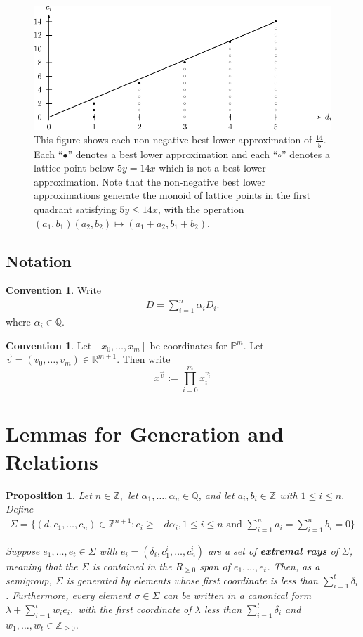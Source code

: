 \documentclass{amsart}
\theoremstyle{plain}
\newtheorem{prop}[thm]{Proposition}
\theoremstyle{definition}
\newtheorem{convention}[thm]{Convention}
\theoremstyle{remark}
\numberwithin{equation}{section}
\newcommand\ssec{\subsection}
\newcommand\br{{\mathbb R}}
\newcommand\bq{{\mathbb Q}}
\newcommand\bp{{\mathbb P}}
\newcommand\bz{{\mathbb Z}}
\newcommand\pdeg{\delta}
\begin{document}
\begin{figure}
\includegraphics{pics/spin-lower-approximations-pic-pics.pdf}
\caption{This figure shows each non-negative best lower
approximation of $\frac{14}{5}.$ Each ``$\bullet$'' denotes a best
lower approximation and each ``$\circ$'' denotes a lattice point
below $5y=14x$ which is not a best lower approximation.  Note that
the non-negative best lower approximations generate the monoid of
lattice points in the first quadrant satisfying  $5y \le 14x$, with
the operation $(a_1, b_1)(a_2, b_2)\mapsto (a_1 + a_2, b_1 + b_2)$.}
\label{fig:s14/5-lattice}
\end{figure}

\ssec{Notation}
\begin{convention}
Write
\begin{align*}
	D = \sum_{i=1}^{n}\alpha_i D_i.
\end{align*}
where $\alpha_i \in \bq$. 
\end{convention}

\begin{convention}
Let $[x_0, \ldots, x_m]$ be coordinates for $\bp^m$. Let
$\vec{v} = (v_0, \ldots, v_m) \in \br^{m + 1}$. Then write
\[
	x^{\vec{v}} := \prod_{i = 0}^{m} x_i^{v_i}
\]
\end{convention}

\section{Lemmas for Generation and Relations}

\begin{prop}
\label{prop:cone-generation}
Let $n \in \bz,$ let $\alpha_1, \ldots, \alpha_n \in \bq$, and let $a_i, b_i \in \bz$ with $1 \leq i \leq n.$ Define
\begin{align*}
	\Sigma = \{(d, c_1, \ldots, c_n) \in \bz^{n+1} : c_i \geq - d \alpha_i,1 \leq i \leq n \text{ and } \sum_{i=1}^{n}a_i = \sum_{i=1}^{n}b_i = 0\}
\end{align*}

\noindent
Suppose $e_1, \ldots, e_t \in \Sigma$ with $e_i = (\pdeg_i, c_1^i,
\ldots, c_n^i)$ are a set of {\bf extremal rays} of $\Sigma$,
meaning that the $\Sigma$ is contained in the $R_{\geq 0}$ span of
$e_1, \ldots, e_t$.  Then, as a semigroup, $\Sigma$ is generated by
elements whose first coordinate is less than $\sum_{i = 1}^{t} \pdeg_i$
. Furthermore, every element $\sigma \in \Sigma$ can be written in
a canonical form $\lambda + \sum_{i=1}^{t} w_i e_i,$ with the first
coordinate of $\lambda$ less than $\sum_{i=1}^{t}\pdeg_i$ and $w_1,
\ldots, w_t \in \bz_{\geq 0}$.
\end{prop}
\end{document}
